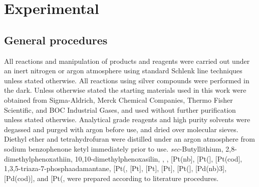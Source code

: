 
\chapter{Experimental}
\label{ch:expt}

\section{General procedures}
\label{section:generalprocedures}


All reactions and manipulation of products and reagents were carried out under an inert nitrogen or argon atmosphere using standard Schlenk line techniques unless stated otherwise.  All reactions using silver compounds were performed in the dark.  Unless otherwise stated the starting materials used in this work were obtained from Sigma-Aldrich, Merck Chemical Companies, Thermo Fisher Scientific, and BOC Industrial Gases, and used without further purification unless stated otherwise.  Analytical grade reagents and high purity solvents were degassed and purged with argon before use, and dried over molecular sieves.  Diethyl ether and tetrahydrofuran were distilled under an argon atmosphere from sodium benzophenone ketyl immediately prior to use.  \emph{sec}-Butyllithium,\cite{Dieter2001} 2,8-dimethylphenoxathiin,\cite{Suter1938} 10,10-dimethylphenoxasilin,\cite{Kranenburg1995} ,\cite{Koshar1973} ,\cite{Giordano1979} [Pt(nb],\cite{Vaughan2011} [Pt(],\cite{Spencer1979} [Pt(cod],\cite{Crascall1990} 1,3,5-triaza-7-phosphaadamantane,\cite{Daigle1998a} [Pt(\ce{C6H10)Cl2]},\cite{Jensen1953} [Pt],\cite{Albrecht2000} [Pt],\cite{Hartley1979} [Pt]\cite{Cramer1967}, [Pt(]\cite{Bradthesis}, [Pd(nb{)3}]\cite{Green1977}, [Pd(cod)], and [Pt(\ce{C6H10)Me2]},\cite{Vaughan2011} were prepared according to literature procedures.  

